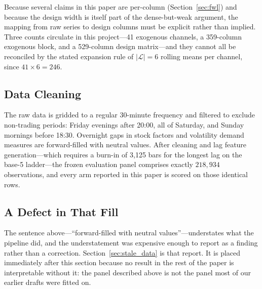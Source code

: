 Because several claims in this paper are per-column
(Section~\ref{sec:fwl}) and because the design width is itself part of the
dense-but-weak argument, the mapping from raw series to design columns must be
explicit rather than implied. Three counts circulate in this project---41
exogenous channels, a 359-column exogenous block, and a 529-column design
matrix---and they cannot all be reconciled by the stated expansion rule of
$|\mathcal{L}| = 6$ rolling means per channel, since $41 \times 6 = 246$.

\subsection{Data Cleaning}
\label{sec:cleaning}

The raw data is gridded to a regular 30-minute frequency and filtered to
exclude non-trading periods: Friday evenings after 20:00, all of Saturday, and
Sunday mornings before 18:30. Overnight gaps in stock factors and volatility
demand measures are forward-filled with neutral values. After cleaning and lag
feature generation---which requires a burn-in of 3{,}125 bars for the longest
lag on the base-5 ladder---the frozen evaluation panel comprises exactly
$218{,}934$ observations, and every arm reported in this paper is scored on
those identical rows.

\subsection{A Defect in That Fill}

The sentence above---``forward-filled with neutral values''---understates what
the pipeline did, and the understatement was expensive enough to report as a
finding rather than a correction. Section~\ref{sec:stale_data} is that report.
It is placed immediately after this section because no result in the rest of
the paper is interpretable without it: the panel described above is not the
panel most of our earlier drafts were fitted on.
